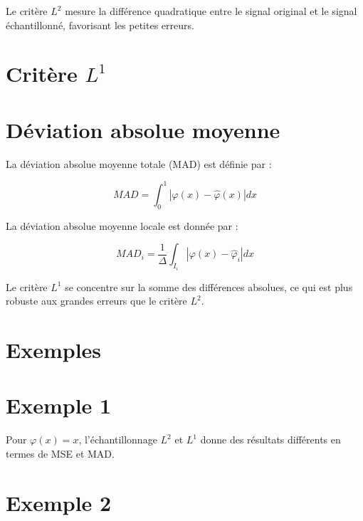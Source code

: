 \documentclass[12pt]{article}
\begin{document}
\begin{tcolorbox}[title={Intuition}]
Le critère $L^2$ mesure la différence quadratique entre le signal original et le signal échantillonné, favorisant les petites erreurs.
\end{tcolorbox}

\newpage

\section{Critère $L^1$}

\sub\section{Déviation absolue moyenne}

La déviation absolue moyenne totale (MAD) est définie par :

\begin{equation}
MAD = \int_0^1 |\varphi(x) - \hat{\varphi}(x)| dx
\end{equation}

La déviation absolue moyenne locale est donnée par :

\begin{equation}
MAD_i = \frac{1}{\Delta} \int_{I_i} |\varphi(x) - \hat{\varphi}_i| dx
\end{equation}

\begin{tcolorbox}[title={Vulgarisation simple}]
Le critère $L^1$ se concentre sur la somme des différences absolues, ce qui est plus robuste aux grandes erreurs que le critère $L^2$.
\end{tcolorbox}

\newpage

\section{Exemples}

\sub\section{Exemple 1}

Pour $\varphi(x) = x$, l'échantillonnage $L^2$ et $L^1$ donne des résultats différents en termes de MSE et MAD.


\sub\section{Exemple 2}
\end{document}
